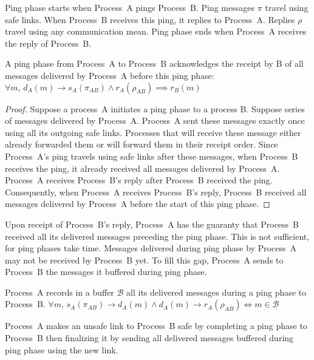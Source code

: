 \begin{definition}
  Ping phase starts when Process~A pings Process~B. Ping messages $\pi$ travel
  using safe links. When Process~B receives this ping, it replies to
  Process~A. Replies $\rho$ travel using any communication mean. Ping phase ends
  when Process~A receives the reply of Process~B.
\end{definition}

\begin{lemma}
  A ping phase from Process~A to Process~B acknowledges the receipt by B of all
  messages delivered by Process~A before this ping phase:
  $\forall m,\, d_A(m) \rightarrow s_A(\pi_{AB}) \wedge r_A(\rho_{AB}) \implies
  r_B(m)$
\end{lemma}

\begin{proof}
  Suppose a process~A initiates a ping phase to a process B. Suppose series of
  messages delivered by Process~A. Process~A sent these messages exactly once
  using all its outgoing safe links. Processes that will receive these message
  either already forwarded them or will forward them in their receipt
  order. Since Process~A's ping travels using safe links after these messages,
  when Process~B receives the ping, it already received all messages delivered
  by Process~A. Process~A receives Process~B's reply after Process~B received
  the ping. Consequently, when Process~A receives Process~B's reply, Process~B
  received all messages delivered by Process~A before the start of this ping
  phase.
\end{proof}

Upon receipt of Process~B's reply, Process~A has the guaranty that Process~B
received all its delivered messages preceding the ping phase. This is not
sufficient, for ping phases take time. Messages delivered during ping phase by
Process~A may not be received by Process~B yet. To fill this gap, Process~A
sends to Process~B the messages it buffered during ping phase.

\begin{definition}[Buffering]
  Process~A records in a buffer $\mathcal{B}$ all its delivered messages during
  a ping phase to Process~B.
  $\forall m,\, s_A(\pi_{AB}) \rightarrow d_A(m) \wedge d_A(m)\rightarrow
  r_A(\rho_{AB}) \Leftrightarrow m \in \mathcal{B} $
\end{definition}


\begin{lemma}
  Process~A makes an unsafe link to Process~B safe by completing a ping phase to
  Process~B then finalizing it by sending all delivered messages buffered during
  ping phase using the new link.
\end{lemma}

